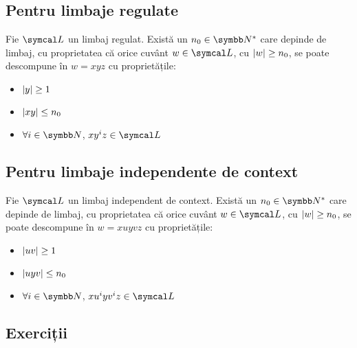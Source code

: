 \subsection*{Pentru limbaje regulate}

Fie \(\limbaj\) un limbaj regulat. Există un \(n_0 \in \naturals^*\) care depinde de limbaj, cu proprietatea că orice cuvânt \(w \in \limbaj\), cu \(\left\lvert w\right\rvert \geq n_0\), se poate descompune în \(w = x y z\) cu proprietățile:
\begin{itemize}
    \item \(\left\lvert y\right\rvert \geq 1\)
    \item \(\left\lvert xy\right\rvert \leq n_0\)
    \item \(\forall i \in \naturals\), \(x y^i z \in \limbaj\)
\end{itemize}

\subsection*{Pentru limbaje independente de context}

Fie \(\limbaj\) un limbaj independent de context. Există un \(n_0 \in \naturals^*\) care depinde de limbaj, cu proprietatea că orice cuvânt \(w \in \limbaj\), cu \(\left\lvert w\right\rvert \geq n_0\), se poate descompune în \(w = x u y v z\) cu proprietățile:
\begin{itemize}
    \item \(\left\lvert u v\right\rvert \geq 1\)
    \item \(\left\lvert u y v\right\rvert \leq n_0\)
    \item \(\forall i \in \naturals\), \(x u^i y v^i z \in \limbaj\)
\end{itemize}

\subsection*{Exerciții}

